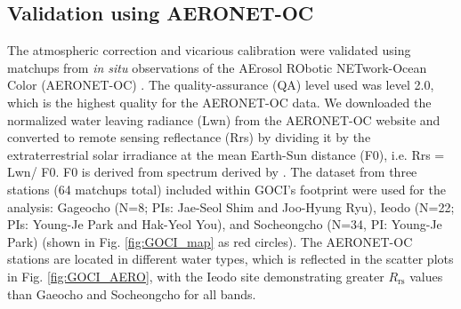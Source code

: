 \documentclass[]{interact}
\theoremstyle{plain}%
\theoremstyle{definition}
\theoremstyle{remark}
\begin{document}
\subsection{Validation using AERONET-OC}
The atmospheric correction and vicarious calibration were validated using matchups from {\it in situ} observations of the AErosol RObotic NETwork-Ocean Color (AERONET-OC) \citep{Zibordi2009}. The quality-assurance (QA) level used was level 2.0, which is the highest quality for the AERONET-OC data. We downloaded the normalized water leaving radiance (Lwn) from the AERONET-OC website and converted to remote sensing reflectance (Rrs) by dividing it by the extraterrestrial solar irradiance at the mean Earth-Sun distance (F0), i.e. Rrs = Lwn/ F0. F0 is derived from spectrum derived by \cite{Thuillier2003}. The dataset from three stations (64 matchups total) included within GOCI's footprint were used for the analysis: Gageocho (N=8; PIs: Jae-Seol Shim and Joo-Hyung Ryu), Ieodo (N=22; PIs: Young-Je Park and Hak-Yeol You), and Socheongcho (N=34, PI: Young-Je Park) (shown in Fig. \ref{fig:GOCI_map} as red circles). The AERONET-OC stations are located in different water types, which is reflected in the scatter plots in Fi{}g. \ref{fig:GOCI_AERO}, with the Ieodo site demonstrating greater $R_\text{rs}$ values than Gaeocho and Socheongcho for all bands. 

\end{document}
